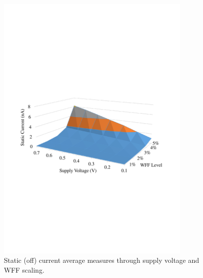\documentclass[diss,pgmicro,english]{iiufrgs}
\begin{document}
    \begin{figure}[t]
        \centering
            \includegraphics[width=0.85\textwidth, trim={1.25cm 9cm 2cm 11cm}, clip]{staticCurrAbs.pdf}
            \caption{Static (off) current average measures through supply voltage and WFF scaling.}
        \label{fig:StatCurrAbs}
    \end{figure}
\end{document}
